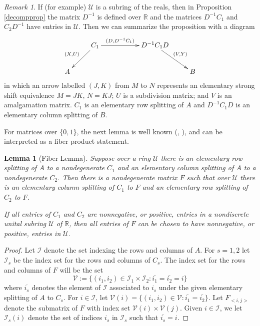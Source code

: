 \documentclass{amsart}
\newtheorem{lemma}[theorem]{Lemma}
\theoremstyle{definition}
\theoremstyle{remark}
\newtheorem{remark}[theorem]{Remark}
\numberwithin{equation}{section}
\begin{document}
{\begin{remark} \label{diagramremark} 
If (for example) $\mathcal U$ is a subring of the reals, 
then in Proposition \ref{decompprop} 
the matrix $D^{-1}$ is defined 
over $\mathbb R$ and 
the matrices $D^{-1}C_1$ and $C_2D^{-1}$ have entries in $\mathcal U$. 
Then we can summarize the proposition with a diagram 
\begin{equation} \label{elsplitdiagram} 
\xymatrix{ 
       & C_1 \ar[rr]^-{(D, D^{-1}C_1)} \ar[dl]_{(X,U)}   &  & D^{-1}C_1D \ar[dr]^{(V,Y)}  &     \\ 
A      &                                          &  &                   &  B 
}
\end{equation}
in which an arrow labelled $(J,K)$ from $M$ to $N$ represents an elementary 
strong shift equivalence $M=JK$,  $N=KJ$; $U$ is a subdivision matrix; and 
$V$  is an amalgamation matrix. $C_1$ is an elementary row splitting of 
$A$ and $D^{-1}C_1D$ is an elementary column splitting of $B$. 
\end{remark} 

For matrices over $\{0,1\}$, the next lemma is well known 
(\cite{Pa}, 
\cite[Theorem 2.1.14]{Ki}),  and can be interpreted 
as a fiber product statement.

\begin{lemma}[Fiber Lemma]  \label{fiberlemma}
Suppose over 
a ring $\mathcal U$ there is an elementary row splitting of 
$A$ to a nondegenerate $C_1$ and an elementary column splitting of $A$ to 
a nondegenerate $C_2$. Then there is a 
nondegenerate matrix $F$ such that 
over $\mathcal U$ there is an elementary  
column splitting of $C_1$ to
$F$ and an elementary  row 
splitting of $C_2$ to $F$. 

If all entries of $C_1$ and $C_2$ are nonnegative, or  positive, entries 
in a nondiscrete unital subring $\mathcal U$ of $\mathbb R$, 
then all entries of $F$ can 
be chosen to have nonnegative, or positive, entries in $\mathcal U$. 
\end{lemma} 
\begin{proof} 
Let $\mathcal I$ denote the set indexing the rows and columns of $A$. 
For $s=1,2$ let $\mathcal I_s$ be the index set for the rows and 
columns of $C_s$. The index set for the rows and columns of $F$ will 
be the set 
\[
\mathcal V:= \{(i_1,i_2)\in \mathcal I_1 \times \mathcal I_2: 
\overline{i_1}=
\overline{i_2}=i \} 
\]
where $\overline{i_s}$ denotes the element of $\mathcal I$ associated 
to $i_s$ under the given elementary splitting of $A$ to $C_s$. 
For $i\in \mathcal I$, let $\mathcal V(i)=\{(i_1,i_2)\in \mathcal V: 
\overline{i_1}=\overline{i_2}\}$. 
Let $F_{<i,j>}$ denote the 
submatrix of $F$ with index set 
$\mathcal V(i)\times \mathcal V(j)$. 
Given $i\in \mathcal I$, we let $\mathcal I_s(i)$ denote the set of indices 
$i_s$ in $\mathcal I_s$ such that $\overline{i_s}=i$. 


\end{proof}}
\end{document}
